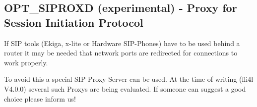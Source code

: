 \subsection{OPT\_SIPROXD (experimental) - Proxy for Session Initiation Protocol}

If SIP tools (Ekiga, x-lite or Hardware SIP-Phones) have to be used
behind a router it may be needed that network ports are redirected
for connections to work properly.

To avoid this a special SIP Proxy-Server can be used. At the time
of writing (fli4l V4.0.0) several such Proxys are being evaluated.
If someone can suggest a good choice please inform us!
